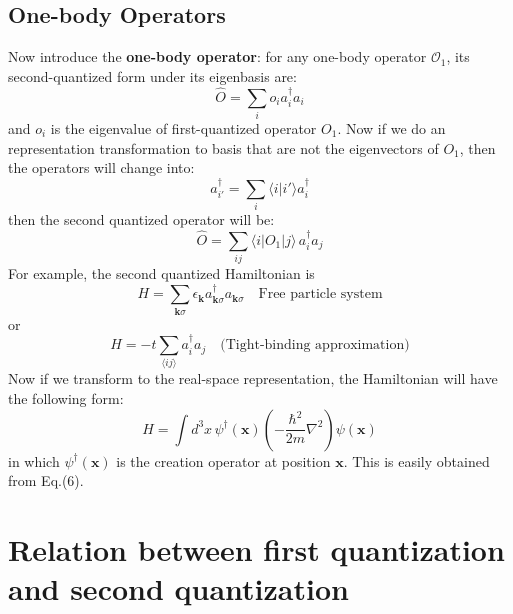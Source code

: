 \documentclass{article}
\newcommand{\mtk}{\mathbf{k}}
\newcommand{\pnx}{\mathbf{x}}
\begin{document}
\subsection{One-body Operators}
Now introduce the {\bf{one-body operator}}: for any one-body operator $\mathcal{O}_1$, its second-quantized form under its eigenbasis are:
\begin{equation}
\hat{O} = \sum_{i}o_i a^\dagger_i a_i
\end{equation}
and $o_i$ is the eigenvalue of first-quantized operator $O_1$. Now if we do an representation transformation to basis that are not the eigenvectors of $O_1$, then the operators will change into:
\begin{equation}
a^\dagger_{i'} = \sum_i \langle i | i'\rangle a^\dagger_i
\end{equation}
then the second quantized operator will be:
\begin{equation}
\hat{O} = \sum_{ij}\langle i | O_1|j\rangle\, a^\dagger_i a_j
\end{equation}
For example, the second quantized Hamiltonian is
$$
H = \sum_{\mtk\sigma}\epsilon_{\mtk}a^\dagger_{\mtk\sigma}a_{\mtk\sigma} \quad\textrm{Free particle system}
$$
or
$$
H = -t\sum_{\langle ij \rangle}a^\dagger_i a_j\quad \textrm{(Tight-binding approximation)}
$$
Now if we transform to the real-space representation, the Hamiltonian will have the following form:
\begin{equation}
H = \int d^3x\,\psi^\dagger(\pnx)\left(-\frac{\hbar^2}{2m}\nabla^2\right)\psi(\pnx)
\end{equation}
in which $\psi^\dagger(\pnx)$ is the creation operator at position $\pnx$. This is easily obtained from Eq.(6).

\section{Relation between first quantization and second quantization}
\end{document}
